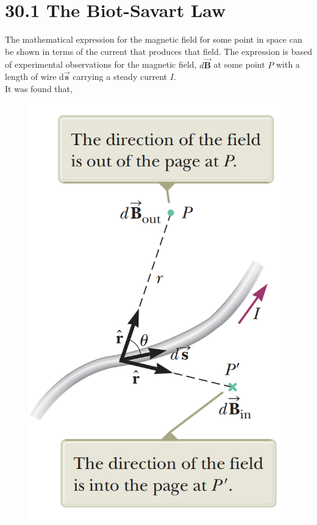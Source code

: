 \documentclass[12pt, titlepage, oneside]{article}
\let\oldvec\vec
\renewcommand{\vec}[1]{\oldvec{\bm{#1}}}
\begin{document}
	\section*{30.1 The Biot-Savart Law}

	The mathematical expression for the magnetic field for some point in space can be shown in terms of the current that produces that field. The expression is based of experimental observations for the magnetic field, $d\vec{B}$ at some point $P$ with a length of wire d$\vec{s}$ carrying a steady current $I$.\\
	
	It was found that,
	
	\begin{figure}
		\begin{center}
			\vspace{-4cm}
			\includegraphics[scale=.4]{1.png}
				\end{center}
	\end{figure}
\end{document}
